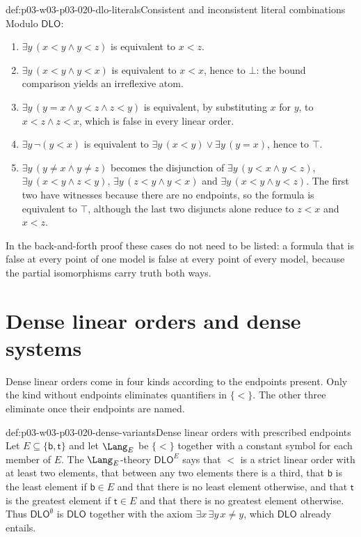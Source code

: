 \begin{hbexample}{def:p03-w03-p03-020-dlo-literals}{Consistent and inconsistent literal combinations}
Modulo \(\mathsf{DLO}\):
\begin{enumerate}
\item \(\exists y\,(x<y\land y<z)\) is equivalent to \(x<z\).
\item \(\exists y\,(x<y\land y<x)\) is equivalent to \(x<x\), hence to
  \(\bot\): the bound comparison yields an irreflexive atom.
\item \(\exists y\,(y=x\land y<z\land z<y)\) is equivalent, by substituting
  \(x\) for \(y\), to \(x<z\land z<x\), which is false in every linear order.
\item \(\exists y\,\neg(y<x)\) is equivalent to
  \(\exists y\,(x<y)\lor\exists y\,(y=x)\), hence to \(\top\).
\item \(\exists y\,(y\ne x\land y\ne z)\) becomes the disjunction of
  \(\exists y\,(y<x\land y<z)\), \(\exists y\,(x<y\land z<y)\),
  \(\exists y\,(z<y\land y<x)\) and \(\exists y\,(x<y\land y<z)\). The
  first two have witnesses because there are no endpoints, so the formula
  is equivalent to \(\top\), although the last two disjuncts alone reduce
  to \(z<x\) and \(x<z\).
\end{enumerate}
In the back-and-forth proof these cases do not need to be listed: a formula
that is false at every point of one model is false at every point of every
model, because the partial isomorphisms carry truth both ways.
\end{hbexample}

\section{Dense linear orders and dense systems}
\label{sec:p03-w03-p03-020-dense}

Dense linear orders come in four kinds according to the endpoints present.
Only the kind without endpoints eliminates quantifiers in \(\{<\}\). The
other three eliminate once their endpoints are named.

\begin{hbdefinition}{def:p03-w03-p03-020-dense-variants}{Dense linear orders with prescribed endpoints}
Let \(E\subseteq\{\mathsf{b},\mathsf{t}\}\) and let \(\Lang_E\) be
\(\{<\}\) together with a constant symbol for each member of \(E\). The
\(\Lang_E\)-theory \(\mathsf{DLO}^{E}\) says that \(<\) is a strict linear
order with at least two elements, that between any two elements there is a
third, that \(\mathsf{b}\) is the least element if
\(\mathsf{b}\in E\) and that there is no least element otherwise, and that
\(\mathsf{t}\) is the greatest element if \(\mathsf{t}\in E\) and that
there is no greatest element otherwise. Thus \(\mathsf{DLO}^{\emptyset}\)
is \(\mathsf{DLO}\) together with the axiom \(\exists x\,\exists y\,x\ne y\),
which \(\mathsf{DLO}\) already entails.
\end{hbdefinition}

